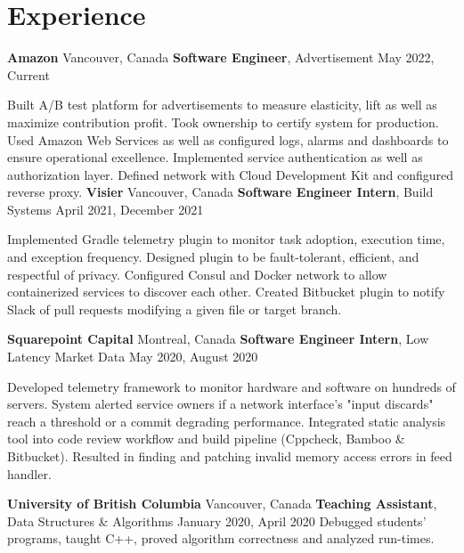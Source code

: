 \section{Experience}

\outerlist
{
    \entrybig
    {
        \textbf{Amazon}
    }
    {
        Vancouver, Canada
    }
    {
        \textbf{Software Engineer}, Advertisement
    }
    {
        May 2022, Current
    }

    \innerlist
    {
        \entry
        {
            Built A/B test platform for advertisements to measure elasticity, lift as well as maximize contribution profit. Took ownership to certify system for production. Used Amazon Web Services as well as configured logs, alarms and dashboards to ensure operational excellence.
        }
        \entry
        {
            Implemented service authentication as well as authorization layer. Defined network with Cloud Development Kit and configured reverse proxy.
        }
   }
    \entrybig
	{
	    \textbf{Visier}
    }
    {
        Vancouver, Canada
    }
	{
	    \textbf{Software Engineer Intern}, Build Systems
    }
    {
        April 2021, December 2021
    }
    
    \innerlist
    {
        \entry
        {
            Implemented Gradle telemetry plugin to monitor task adoption, execution time, and exception frequency. Designed plugin to be fault-tolerant, efficient, and respectful of privacy.
        }
        \entry
        {
            Configured Consul and Docker network to allow containerized services to discover each other.
        }
        \entry
        {
            Created Bitbucket plugin to notify Slack of pull requests modifying a given file or target branch.
        }
    }
    
    \entrybig
	{
	    \textbf{Squarepoint Capital}
    }
    {
        Montreal, Canada
    }
	{
	    \textbf{Software Engineer Intern}, Low Latency Market Data
    }
    {
        May 2020, August 2020
    }
    
    \innerlist
    {
	    \entry
        {
            Developed telemetry framework to monitor hardware and software on hundreds of servers. System alerted service owners if a network interface's "input discards" reach a threshold or a commit degrading performance.
        }
	    \entry
	    {
            Integrated static analysis tool into code review workflow and build pipeline (Cppcheck, Bamboo \& Bitbucket). Resulted in finding and patching invalid memory access errors in feed handler.
        }
    }

    \entrybig
	{
        \textbf{University of British Columbia}
    }
    {
        Vancouver, Canada
    }
	{
        \textbf{Teaching Assistant}, Data Structures \& Algorithms
    }
    {
        January 2020, April 2020
    }
    \innerlist
    {
        \entry
        {
            Debugged students’ programs, taught C++, proved algorithm correctness and analyzed run-times.
        }
    }
}
